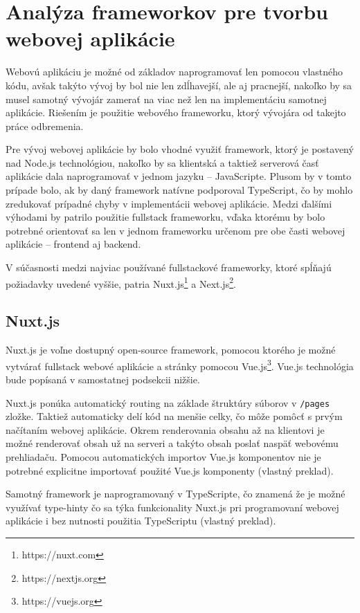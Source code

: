 \clearpage

\section {Analýza frameworkov pre tvorbu webovej aplikácie}
Webovú aplikáciu je možné od základov naprogramovať len pomocou vlastného kódu, avšak takýto vývoj by bol nie len zdĺhavejší, ale aj pracnejší, nakoľko by sa musel samotný vývojár zamerať na viac než len na implementáciu samotnej aplikácie. Riešením je použitie webového frameworku, ktorý vývojára od takejto práce odbremenia. 

Pre vývoj webovej aplikácie by bolo vhodné využiť framework, ktorý je postavený nad Node.js technológiou, nakoľko by sa klientská a taktiež serverová časť aplikácie dala naprogramovať v jednom jazyku -- JavaScripte. Plusom by v tomto prípade bolo, ak by daný framework natívne podporoval TypeScript, čo by mohlo zredukovať prípadné chyby v implementácii webovej aplikácie.
Medzi ďalšími výhodami by patrilo použitie fullstack frameworku, vďaka ktorému by bolo potrebné orientovať sa len v jednom frameworku určenom pre obe časti webovej aplikácie -- frontend aj backend.

V súčasnosti medzi najviac používané fullstackové frameworky, ktoré \newline spĺňajú požiadavky uvedené vyššie, patria Nuxt.js\footnote{https://nuxt.com} a Next.js\footnote{https://nextjs.org}.

\subsection {Nuxt.js}
Nuxt.js je voľne dostupný open-source framework, pomocou ktorého je možné vytvárať fullstack webové aplikácie a stránky pomocou Vue.js\footnote{https://vuejs.org}. Vue.js technológia bude popísaná v samostatnej podsekcii nižšie.

Nuxt.js ponúka automatický routing na základe štruktúry súborov v \newline \texttt{/pages} zložke. Taktiež automaticky delí kód na menšie celky, čo môže pomôcť s prvým načítaním webovej aplikácie. Okrem renderovania obsahu až na klientovi je možné renderovať obsah už na serveri a takýto obsah poslať naspäť webovému prehliadaču. Pomocou automatických importov Vue.js komponentov nie je potrebné explicitne importovať použité Vue.js komponenty \cite{nuxt_introduction} (vlastný preklad).

Samotný framework je naprogramovaný v TypeScripte, čo znamená že je možné využívať type-hinty čo sa týka funkcionality Nuxt.js pri programovaní webovej aplikácie i bez nutnosti použitia TypeScriptu \cite{nuxt_introduction} (vlastný preklad).

